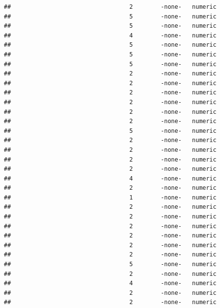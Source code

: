 \documentclass[
  12pt,
]{article}
\begin{document}
\begin{verbatim}
##                                  2        -none-   numeric                    
##                                  5        -none-   numeric                    
##                                  5        -none-   numeric                    
##                                  4        -none-   numeric                    
##                                  5        -none-   numeric                    
##                                  5        -none-   numeric                    
##                                  5        -none-   numeric                    
##                                  2        -none-   numeric                    
##                                  2        -none-   numeric                    
##                                  2        -none-   numeric                    
##                                  2        -none-   numeric                    
##                                  2        -none-   numeric                    
##                                  2        -none-   numeric                    
##                                  5        -none-   numeric                    
##                                  2        -none-   numeric                    
##                                  2        -none-   numeric                    
##                                  2        -none-   numeric                    
##                                  2        -none-   numeric                    
##                                  4        -none-   numeric                    
##                                  2        -none-   numeric                    
##                                  1        -none-   numeric                    
##                                  2        -none-   numeric                    
##                                  2        -none-   numeric                    
##                                  2        -none-   numeric                    
##                                  2        -none-   numeric                    
##                                  2        -none-   numeric                    
##                                  2        -none-   numeric                    
##                                  5        -none-   numeric                    
##                                  2        -none-   numeric                    
##                                  4        -none-   numeric                    
##                                  2        -none-   numeric                    
##                                  2        -none-   numeric                    

\end{verbatim}
\end{document}
